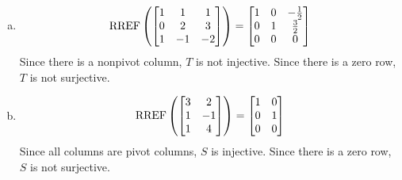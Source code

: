 \documentclass{sbgLAquiz}
\begin{document}
\begin{solution}
\begin{enumerate}[(a)]
\item $$\operatorname{RREF}\left( \begin{bmatrix} 1 &  1 & 1 \\ 0  & 2 & 3 \\ 1  & -1 & -2 \end{bmatrix} \right) = \begin{bmatrix} 1 &  0 & -\frac{1}{2} \\ 0  & 1 & \frac{3}{2} \\ 0& 0 & 0  \end{bmatrix}$$
Since there is a nonpivot column, $T$ is not injective.  Since there is a zero row, $T$ is not surjective.
\item $$\operatorname{RREF} \left( \begin{bmatrix} 3 & 2 \\ 1 & -1 \\ 1 & 4 \end{bmatrix} \right) = \begin{bmatrix} 1 & 0 \\ 0 & 1 \\ 0 & 0 \end{bmatrix}$$
Since all columns are pivot columns, $S$ is injective.  Since there is a zero row, $S$ is not surjective.
\end{enumerate}
\end{solution}
\end{document}
